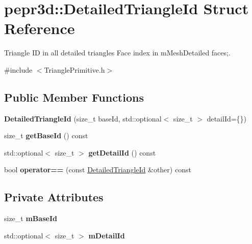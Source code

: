 \hypertarget{structpepr3d_1_1_detailed_triangle_id}{}\section{pepr3d\+::Detailed\+Triangle\+Id Struct Reference}
\label{structpepr3d_1_1_detailed_triangle_id}


Triangle ID in all detailed triangles Face index in m\+Mesh\+Detailed faces;.  




{\ttfamily \#include $<$Triangle\+Primitive.\+h$>$}

\subsection*{Public Member Functions}
\begin{DoxyCompactItemize}
\item 
\mbox{\label{structpepr3d_1_1_detailed_triangle_id_af758a086dc2823986b1c70ec29a66f8c}} 
{\bfseries Detailed\+Triangle\+Id} (size\+\_\+t base\+Id, std\+::optional$<$ size\+\_\+t $>$ detail\+Id=\{\})
\item 
\mbox{\label{structpepr3d_1_1_detailed_triangle_id_a12c3624f3da8776679f07a061aa97bc5}} 
size\+\_\+t {\bfseries get\+Base\+Id} () const
\item 
\mbox{\label{structpepr3d_1_1_detailed_triangle_id_afb6b76f863e071c9327b1eb15ccff0ff}} 
std\+::optional$<$ size\+\_\+t $>$ {\bfseries get\+Detail\+Id} () const
\item 
\mbox{\label{structpepr3d_1_1_detailed_triangle_id_afb2c674521599b6e944134a9545443b2}} 
bool {\bfseries operator==} (const \mbox{\hyperlink{structpepr3d_1_1_detailed_triangle_id}{Detailed\+Triangle\+Id}} \&other) const
\end{DoxyCompactItemize}
\subsection*{Private Attributes}
\begin{DoxyCompactItemize}
\item 
\mbox{\label{structpepr3d_1_1_detailed_triangle_id_a9320ee2b908edfc7e1932fbfdde2483c}} 
size\+\_\+t {\bfseries m\+Base\+Id}
\item 
\mbox{\label{structpepr3d_1_1_detailed_triangle_id_a61de43049478653158ca696d4cb66e2a}} 
std\+::optional$<$ size\+\_\+t $>$ {\bfseries m\+Detail\+Id}
\end{DoxyCompactItemize}


